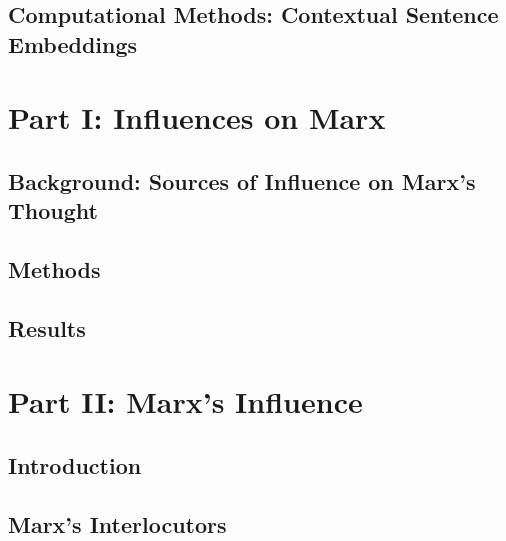 

\subsection{Computational Methods: Contextual Sentence Embeddings\label{intro:methods}}




\section{Part I: Influences on Marx}

\subsection{Background: Sources of Influence on Marx's Thought\label{sec:influence}}

%


\subsection{Methods\label{sec:methods}}



\subsection{Results\label{sec:results}}




\section{Part II: Marx's Influence}

\subsection{Introduction}



\subsection{Marx's Interlocutors}



